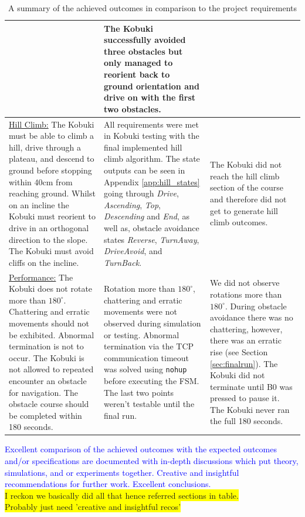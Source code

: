 \begin{table}[H]
\begin{tabularx}{\textwidth}{|X|X|X|}
    & The Kobuki successfully avoided three obstacles but only managed to reorient back to ground orientation and drive on with the first two obstacles.
    \\
    \hline
    \underline{Hill Climb:}
    The Kobuki must be able to climb a hill, drive through a plateau, and descend to ground before stopping within 40cm from reaching ground.
    Whilst on an incline the Kobuki must reorient to drive in an orthogonal direction to the slope.
    The Kobuki must avoid cliffs on the incline.
    & All requirements were met in Kobuki testing with the final implemented hill climb algorithm. The state outputs can be seen in Appendix \ref{app:hill_states} going through \textit{Drive}, \textit{Ascending}, \textit{Top}, \textit{Descending} and \textit{End}, as well as, obstacle avoidance states \textit{Reverse}, \textit{TurnAway}, \textit{DriveAvoid}, and \textit{TurnBack}.
    & The Kobuki did not reach the hill climb section of the course and therefore did not get to generate hill climb outcomes.
    \\
    \hline
    \underline{Performance:}
    The Kobuki does not rotate more than $180^\circ$.
    Chattering and erratic movements should not be exhibited.
    Abnormal termination is not to occur.
    The Kobuki is not allowed to repeated encounter an obstacle for navigation.
    The obstacle course should be completed within 180 seconds.
    & Rotation more than $180^\circ$, chattering and erratic movements were not observed during simulation or testing. Abnormal termination via the TCP communication timeout was solved using \texttt{nohup} before executing the FSM. The last two points weren't testable until the final run.
    & We did not observe rotations more than $180^\circ$. During obstacle avoidance there was no chattering, however, there was an erratic rise (see Section \ref{sec:finalrun}). The Kobuki did not terminate until B0 was pressed to pause it. The Kobuki never ran the full 180 seconds.
    \\
    \hline
\end{tabularx}
\caption{A summary of the achieved outcomes in comparison to the project requirements}
\label{tab:outcomes}
\end{table}

\textcolor{blue}{Excellent comparison of the achieved outcomes with the expected outcomes and/or specifications are documented with in-depth discussions which put theory, simulations, and or experiments together. Creative and insightful recommendations for further work. Excellent conclusions.}\\ 
\colorbox{yellow}{I reckon we basically did all that hence referred sections in table.}\\
\colorbox{yellow}{Probably just need 'creative and insightful recos'}

